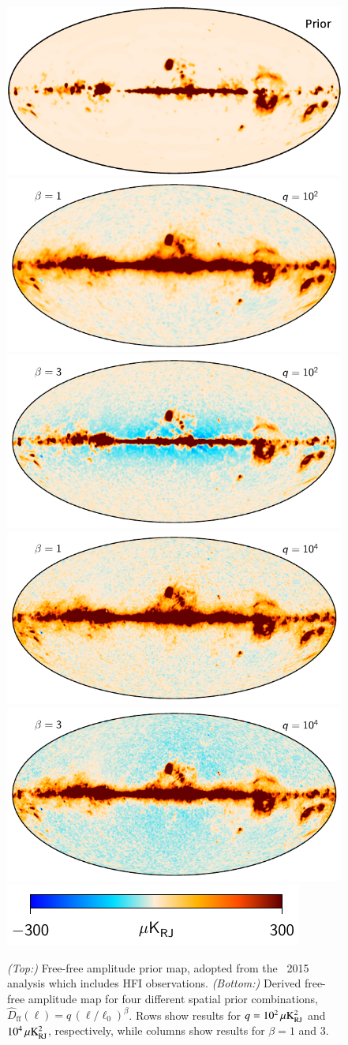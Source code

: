 \documentclass[twocolumn]{aa}
\begin{document}
\begin{figure}
  \center
  \includegraphics[width=0.60\linewidth]{figs/ff_prior_mean.pdf}\\    
  \includegraphics[width=0.49\linewidth]{figs/ff_prior_amp100_beta1.pdf}
  \includegraphics[width=0.49\linewidth]{figs/ff_prior_amp100_beta3.pdf}\\
  \includegraphics[width=0.49\linewidth]{figs/ff_prior_amp10000_beta1.pdf}
  \includegraphics[width=0.49\linewidth]{figs/ff_prior_amp10000_beta3.pdf}\\
  \includegraphics[width=0.4\linewidth]{figs/colourbar_300uK_RJ.pdf}
  \caption{\emph{(Top:)} Free-free amplitude prior map, adopted from
    the \Planck\ 2015 analysis which includes HFI observations. \emph{(Bottom:)} Derived free-free amplitude map for four different spatial prior combinations, $\hat{D}_{\mathrm{ff}}(\ell) = q\,(\ell/\ell_{0})^{\beta}$. Rows show results for $q=10^2\muK_{\mathrm{RJ}}^2$ and $10^4\muK_{\mathrm{RJ}}^2$, respectively, while columns show results for $\beta=1$ and 3.  }
  \label{fig:ff_amp_priors}
\end{figure}
\end{document}
